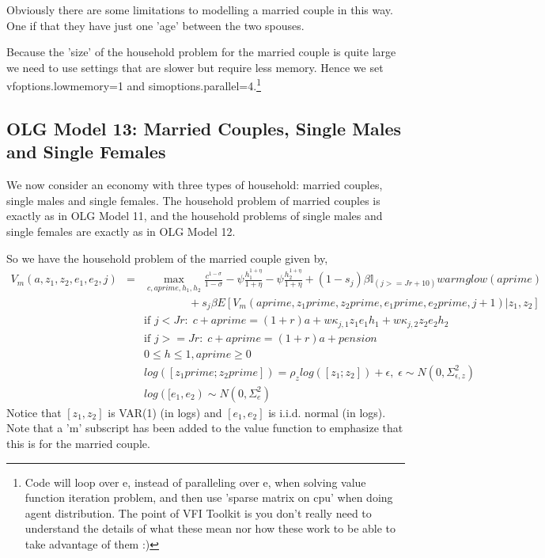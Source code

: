 Obviously there are some limitations to modelling a married couple in this way. One if that they have just one 'age' between the two spouses.

Because the 'size' of the household problem for the married couple is quite large we need to use settings that are slower but require less memory. Hence we set vfoptions.lowmemory=1 and simoptions.parallel=4.\footnote{Code will loop over e, instead of paralleling over e, when solving value function iteration problem, and then use 'sparse matrix on cpu' when doing agent distribution. The point of VFI Toolkit is you don't really need to understand the details of what these mean nor how these work to be able to take advantage of them :)}

\subsection{OLG Model 13: Married Couples, Single Males and Single Females}
We now consider an economy with three types of household: married couples, single males and single females. The household problem of married couples is exactly as in OLG Model 11, and the household problems of single males and single females are exactly as in OLG Model 12.

So we have the household problem of the married couple given by,
\begin{eqnarray*}
 V_m(a,z_1,z_2,e_1,e_2,j)&=& \max_{c,aprime,h_1,h_2} \frac{c^{1-\sigma}}{1-\sigma} - \psi \frac{h_1^{1+\eta}}{1+\eta}- \psi \frac{h_2^{1+\eta}}{1+\eta} + (1-s_j)\beta  \mathbb{I}_{(j>=Jr+10)} warmglow(aprime) \\
 && \quad \quad \quad \quad+ s_j \beta E[V_m(aprime,z_1prime,z_2prime,e_1prime,e_2prime,j+1)|z_1,z_2] \\
&& \text{if }j<Jr: \; c+aprime=(1+r)a+w \kappa_{j,1}  z_1 e_1 h_1+w \kappa_{j,2}  z_2 e_2 h_2 \\
&& \text{if }j>=Jr: \; c+aprime=(1+r)a +pension\\
&& 0\leq h \leq 1, aprime\geq 0 \\
&& log([z_1prime; z_2prime])=\rho_{z} log([z_1; z_2]) + \epsilon, \; \epsilon \sim N(0,\Sigma_{\epsilon,z}^2) \\
&& log([e_1,e_2) \sim N(0,\Sigma_{e}^2)
\end{eqnarray*}
Notice that $[z_1,z_2]$ is VAR(1) (in logs) and $[e_1,e_2]$ is i.i.d. normal (in logs). Note that a 'm' subscript has been added to the value function to emphasize that this is for the married couple.

